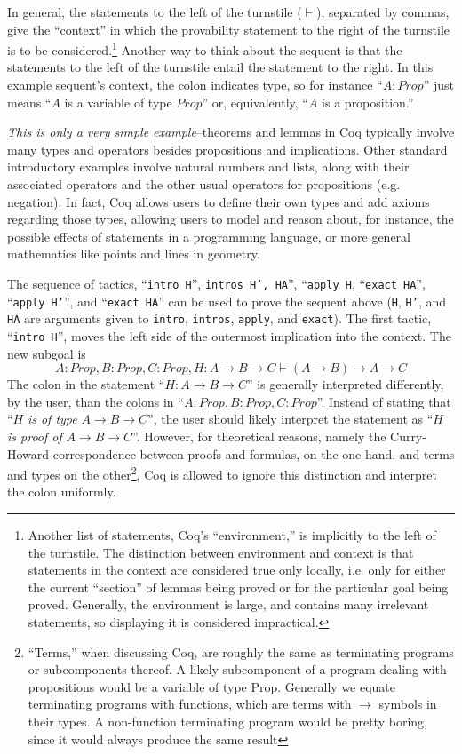 \documentclass[11pt]{amsart}
\newcommand{\ra}{\ensuremath{\rightarrow}}
\begin{document}
In general, the statements to the left of the turnstile ($\vdash$), separated by commas, give the ``context'' in which the provability statement to the right of the turnstile is to be considered.\footnote{Another list of statements, Coq's ``environment,'' is implicitly to the left of the turnstile.  The distinction between environment and context is that statements in the context are considered true only locally, i.e. only for either the current ``section'' of lemmas being proved or for the particular goal being proved.  Generally, the environment is large, and contains many irrelevant statements, so displaying it is considered impractical.}  Another way to think about the sequent is that the statements to the left of the turnstile entail the statement to the right.  In this example sequent's context, the colon indicates type, so for instance ``$A : Prop$'' just means ``$A$ is a variable of type $Prop$'' or, equivalently, ``$A$ is a proposition.''

\textit{This is only a very simple example}--theorems and lemmas in Coq typically involve many types and operators besides propositions and implications.  Other standard introductory examples involve natural numbers and lists, along with their associated operators and the other usual operators for propositions (e.g. negation).  In fact, Coq allows users to define their own types and add axioms regarding those types, allowing users to model and reason about, for instance, the possible effects of statements in a programming language, or more general mathematics like points and lines in geometry.

The sequence of tactics, ``\texttt{intro H}'', \texttt{intros H', HA}'', ``\texttt{apply H}, ``\texttt{exact HA}'', ``\texttt{apply H'}'', and ``\texttt{exact HA}'' can be used to prove the sequent above (\texttt{H}, \texttt{H'}, and \texttt{HA} are arguments given to \texttt{intro}, \texttt{intros}, \texttt{apply}, and \texttt{exact}).  The first tactic, ``\texttt{intro H}'', moves the left side of the outermost implication into the context.  The new subgoal is
\[A : Prop, B : Prop, C : Prop, H : A \ra B \ra C \vdash (A \ra B) \ra A \ra C\]
The colon in the statement ``$H : A \ra B \ra C$'' is generally interpreted differently, by the user, than the colons in ``$A : Prop, B : Prop, C : Prop$''.  Instead of stating that ``$H$ \textit{is of type} $A \ra B \ra C$'', the user should likely interpret the statement as ``$H$ \textit{is proof of} $A \ra B \ra C$''.  However, for theoretical reasons, namely the Curry-Howard correspondence between proofs and formulas, on the one hand, and terms and types on the other\footnote{``Terms,'' when discussing Coq, are roughly the same as terminating programs or subcomponents thereof.  A likely subcomponent of a program dealing with propositions would be a variable of type Prop. Generally we equate terminating programs with functions, which are terms with $\ra$ symbols in their types.  A non-function terminating program would be pretty boring, since it would always produce the same result}, Coq is allowed to ignore this distinction and interpret the colon uniformly.
\end{document}

